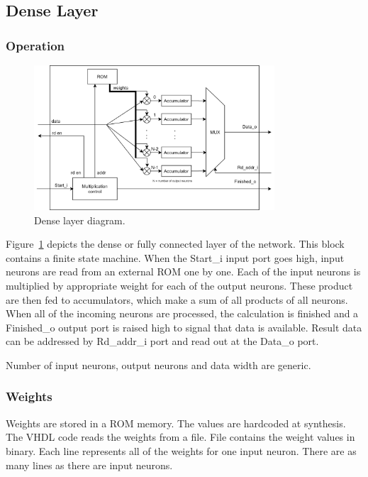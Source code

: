 \subsection{Dense Layer}
\label{sec:hw-fully-connected}

\subsubsection{Operation}
\begin{figure}[h]
	\centering
	\includegraphics[width=0.8\textwidth]{img/blockDiagramDense.png}
	\caption[Dense layer diagram]{Dense layer diagram.}
	\label{fig:denseLayerBlockDiagram}
\end{figure}

Figure~\ref{fig:denseLayerBlockDiagram} depicts the dense or fully connected layer of the network. This block contains a finite state machine. When the Start\_i input port goes high, input neurons are read from an external ROM one by one. Each of the input neurons is multiplied by appropriate weight for each of the output neurons. These product are then fed to accumulators, which make a sum of all products of all neurons. When all of the incoming neurons are processed, the calculation is finished and a Finished\_o output port is raised high to signal that data is available. Result data can be addressed by Rd\_addr\_i port and read out at the Data\_o port.

Number of input neurons, output neurons and data width are generic.

\subsubsection{Weights}

Weights are stored in a ROM memory. The values are hardcoded at synthesis. The VHDL code reads the weights from a file. File contains the weight values in binary. Each line represents all of the weights for one input neuron. There are as many lines as there are input neurons.

